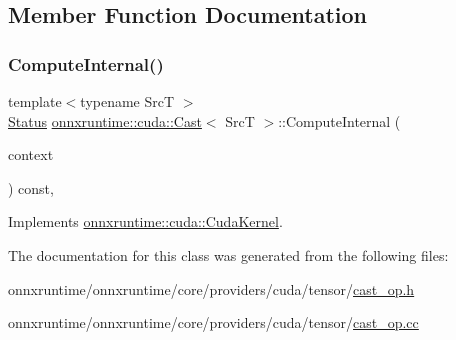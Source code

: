 \subsection{Member Function Documentation}
\mbox{\label{classonnxruntime_1_1cuda_1_1Cast_a3f827c1fa734b18897b0b06c53161efd}} 
\subsubsection{\texorpdfstring{Compute\+Internal()}{ComputeInternal()}}
{\footnotesize\ttfamily template$<$typename SrcT $>$ \\
\mbox{\hyperlink{classonnxruntime_1_1common_1_1Status}{Status}} \mbox{\hyperlink{classonnxruntime_1_1cuda_1_1Cast}{onnxruntime\+::cuda\+::\+Cast}}$<$ SrcT $>$\+::Compute\+Internal (\begin{DoxyParamCaption}\item[{\mbox{\hyperlink{classonnxruntime_1_1OpKernelContext}{Op\+Kernel\+Context}} $\ast$}]{context }\end{DoxyParamCaption}) const\hspace{0.3cm}{\ttfamily [override]}, {\ttfamily [virtual]}}



Implements \mbox{\hyperlink{classonnxruntime_1_1cuda_1_1CudaKernel_aca7af04ae448017d6023d30bba231ebb}{onnxruntime\+::cuda\+::\+Cuda\+Kernel}}.



The documentation for this class was generated from the following files\+:\begin{DoxyCompactItemize}
\item 
onnxruntime/onnxruntime/core/providers/cuda/tensor/\mbox{\hyperlink{cuda_2tensor_2cast__op_8h}{cast\+\_\+op.\+h}}\item 
onnxruntime/onnxruntime/core/providers/cuda/tensor/\mbox{\hyperlink{cuda_2tensor_2cast__op_8cc}{cast\+\_\+op.\+cc}}\end{DoxyCompactItemize}
